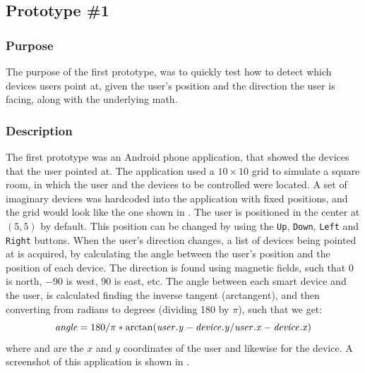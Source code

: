 \subsection{Prototype \#1}
\label{sec:implementation:prototypes:prototype1}
\subsubsection{Purpose}
The purpose of the first prototype, 
was to quickly test how to detect which devices users point at, 
given the user's position and the direction the user is facing, 
along with the underlying math.

\subsubsection{Description}
The first prototype was an Android phone application, 
that showed the devices that the user pointed at.
The application used a $10 \times 10$ grid to simulate a square room, 
in which the user and the devices to be controlled were located.
A set of imaginary devices was hardcoded into the application with fixed positions, 
and the grid would look like the one shown in .
The user is positioned in the center at $(5,5)$ by default. 
This position can be changed by using the \texttt{Up}, \texttt{Down}, \texttt{Left} and \texttt{Right} buttons.
When the user's direction changes, 
a list of devices being pointed at is acquired, 
by calculating the angle between the user's position and the position of each device.
The direction is found using magnetic fields, 
such that \num{0} is north, \num{-90} is west, \num{90} is east, etc. 
The angle between each smart device and the user, 
is calculated finding the inverse tangent (arctangent), 
and then converting from radians to degrees (dividing \num{180} by $\pi$), 
such that we get:
\begin{equation}\label{eq:angle}
\var{angle} = 180 / \pi * \arctan(\var{user.y} - \var{device.y} / \var{user.x} - \var{device.x})
\end{equation}
where  and  are the $x$ and $y$ coordinates of the user and likewise for the device.
A screenshot of this application is shown in .


